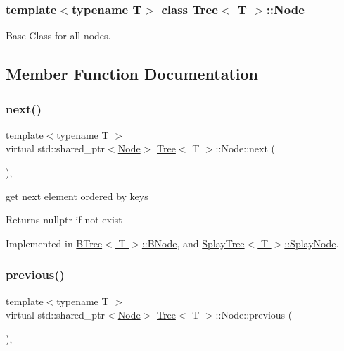 \subsubsection*{template$<$typename T$>$\newline
class Tree$<$ T $>$\+::\+Node}

Base Class for all nodes. 

\subsection{Member Function Documentation}
\mbox{\label{classTree_1_1Node_a50f15b262b0d6c572904be68ba067ca6}} 
\subsubsection{\texorpdfstring{next()}{next()}}
{\footnotesize\ttfamily template$<$typename T $>$ \\
virtual std\+::shared\+\_\+ptr$<$\hyperlink{classTree_1_1Node}{Node}$>$ \hyperlink{classTree}{Tree}$<$ T $>$\+::Node\+::next (\begin{DoxyParamCaption}{ }\end{DoxyParamCaption})\hspace{0.3cm}{\ttfamily [pure virtual]}, {\ttfamily [noexcept]}}



get next element ordered by keys 

\begin{DoxyReturn}{Returns}
nullptr if not exist 
\end{DoxyReturn}


Implemented in \hyperlink{classBTree_1_1BNode_a8440e89eab5284dc118c00de4e7e619b}{B\+Tree$<$ T $>$\+::\+B\+Node}, and \hyperlink{classSplayTree_1_1SplayNode_a958decc1fc4c1c2aa4c80c5fc4e42acd}{Splay\+Tree$<$ T $>$\+::\+Splay\+Node}.

\mbox{\label{classTree_1_1Node_a3f912d90adc2c50de5ce7f96e6695c96}} 
\subsubsection{\texorpdfstring{previous()}{previous()}}
{\footnotesize\ttfamily template$<$typename T $>$ \\
virtual std\+::shared\+\_\+ptr$<$\hyperlink{classTree_1_1Node}{Node}$>$ \hyperlink{classTree}{Tree}$<$ T $>$\+::Node\+::previous (\begin{DoxyParamCaption}{ }\end{DoxyParamCaption})\hspace{0.3cm}{\ttfamily [pure virtual]}, {\ttfamily [noexcept]}}



